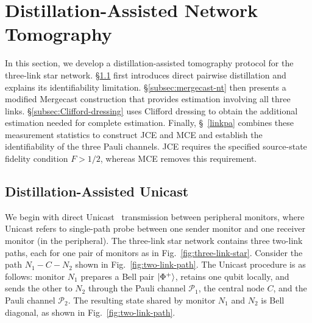 \section{Distillation-Assisted Network Tomography}
\label{sec:dist-qnt}

In this section, we develop a distillation-assisted tomography
protocol for the three-link star network.
\S\ref{subsec:direct-nt} first introduces direct pairwise
distillation and explains its identifiability limitation.
\S\ref{subsec:mergecast-nt} then presents a modified Mergecast
construction that provides estimation involving all three links.
\S\ref{subsec:Clifford-dressing} uses Clifford dressing to
obtain the additional estimation needed for complete estimation.
Finally, \S~\ref{linkpa} combines these measurement statistics
to construct JCE and MCE and establish the identifiability
of the three Pauli channels.
JCE requires the specified source-state fidelity condition
$F>1/2$, whereas MCE removes this requirement.

\subsection{Distillation-Assisted Unicast }
\label{subsec:direct-nt}



We begin with direct Unicast~\cite{Pirandola_2019} transmission between peripheral monitors,
where Unicast refers to single-path probe between one sender monitor and one receiver monitor (in the peripheral).
The three-link star network contains three two-link paths, each for
one pair of monitors as in Fig.~\ref{fig:three-link-star}. Consider the path
\(N_1\!-C\!-N_2\) shown in Fig.~\ref{fig:two-link-path}.
The Unicast procedure is as follows:
monitor \(N_1\) prepares a Bell pair \(\ket{\Phi^+}\), retains one qubit locally,
and sends the other to \(N_2\) through the Pauli channel \(\mathcal P_1\),
the central node \(C\), and the Pauli channel \(\mathcal P_2\).
The resulting state shared by monitor \(N_1\) and \(N_2\) is Bell diagonal,
as shown in Fig.~\ref{fig:two-link-path}.

